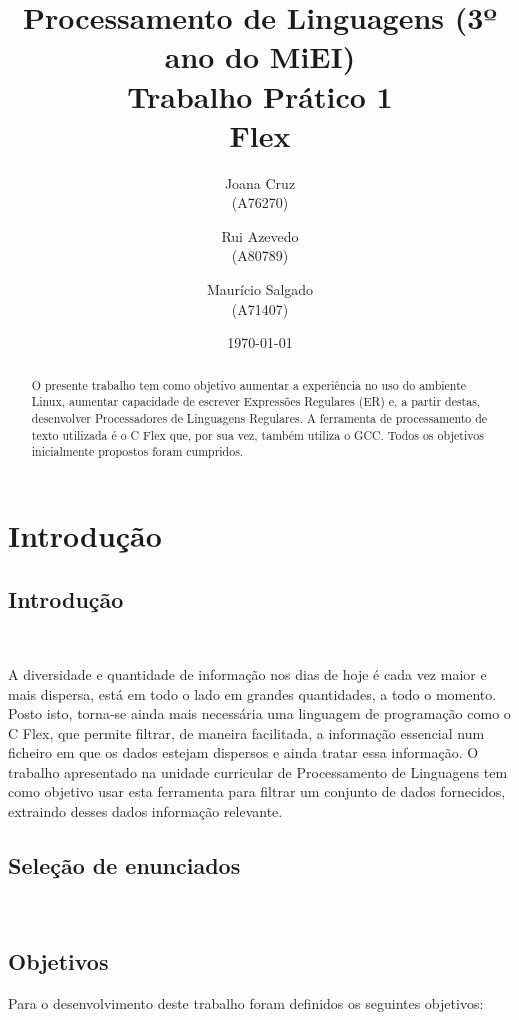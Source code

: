 \documentclass{report}
\title{Processamento de Linguagens (3º ano do MiEI)\\ \textbf{Trabalho Prático 1}\\ Flex}
\author{Joana Cruz\\ (A76270) \and Rui Azevedo\\ (A80789) \and Maurício Salgado\\ (A71407) }
\date{\today}
\begin{document}
    
    \maketitle
    
    \begin{abstract}
    
    O presente trabalho tem como objetivo aumentar a experiência no uso do ambiente Linux, aumentar capacidade de escrever Expressões Regulares (ER) e, a partir destas,  desenvolver Processadores de Linguagens Regulares.
    A ferramenta de processamento de texto utilizada é o C Flex que, por sua vez, também utiliza o GCC. Todos os objetivos inicialmente propostos foram cumpridos.
    
    \end{abstract}
    
    \tableofcontents
    
    \chapter{Introdu\c{c}\~ao} \label{intro}
    
    \section*{Introdu\c{c}\~ao} \
    
    A diversidade e quantidade de informação nos dias de hoje é cada vez maior e mais dispersa, está em todo o lado em grandes quantidades, a todo o momento. Posto isto, torna-se ainda mais necessária uma linguagem de programação como o C Flex, que permite filtrar, de maneira facilitada, a informação essencial num ficheiro em que os dados estejam dispersos e ainda tratar essa informação. O trabalho apresentado na unidade curricular de Processamento de Linguagens tem como objetivo usar esta ferramenta para filtrar um conjunto de dados fornecidos, extraindo desses dados informação relevante.
    
    \section*{Sele\c{c}\~ao de enunciados} \
    
    
    \section*{Objetivos}
    Para o desenvolvimento deste trabalho foram definidos os seguintes objetivos:
\end{document}
